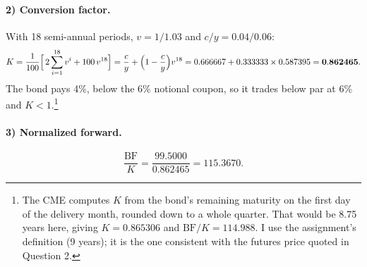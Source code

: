 \documentclass[11pt]{article}
\newcommand{\BF}{\mathrm{BF}}
\begin{document}
\paragraph{2) Conversion factor.}
With 18 semi-annual periods, $v=1/1.03$ and $c/y=0.04/0.06$:
\[
K=\frac{1}{100}\Bigl[\,2\sum_{i=1}^{18}v^{i}+100\,v^{18}\Bigr]
=\frac{c}{y}+\Bigl(1-\frac{c}{y}\Bigr)v^{18}
=0.666667+0.333333\times0.587395=\mathbf{0.862465}.
\]
The bond pays 4\%, below the 6\% notional coupon, so it trades below par at 6\% and $K<1$.\footnote{The CME computes $K$ from the bond's remaining maturity on the first day of the delivery month, rounded down to a whole quarter. That would be 8.75 years here, giving $K=0.865306$ and $\BF/K=114.988$. I use the assignment's definition (9 years); it is the one consistent with the futures price quoted in Question 2.}

\paragraph{3) Normalized forward.}
\[
\frac{\BF}{K}=\frac{99.5000}{0.862465}=\mathbf{115.3670}.
\]
\end{document}
